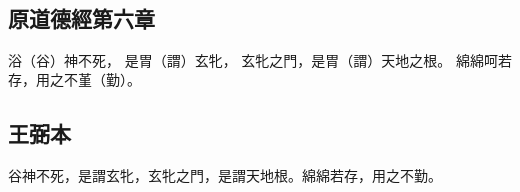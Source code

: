 ﻿%
%

\chapter{~}

\section{原道德經第六章}

\begin{withgezhu}

\zhsong


浴（\textcolor{tongjia-color}{谷}）神\colorbox{adding-color}{不}死，
是胃（\textcolor{tongjia-color}{謂}）玄牝，
玄牝之門，是胃（\textcolor{tongjia-color}{謂}）\colorbox{adding-color}{天}地之根。
綿綿呵若存，用之不堇（\textcolor{tongjia-color}{勤}）。

\end{withgezhu}

\section{王弼本}

\begin{withgezhu}

\zhsong

谷神不死，是謂玄牝，玄牝之門，是謂天地根。綿綿若存，用之不勤。

\end{withgezhu}
